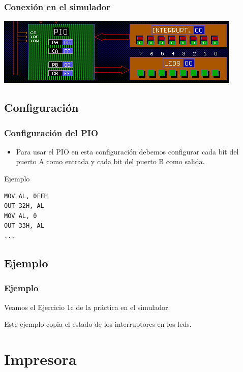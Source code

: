 \documentclass{beamer}
\begin{document}
\begin{frame}
\frametitle{Conexión en el simulador}
\begin{center}
 \includegraphics[scale=0.75]{pio0.png}
\end{center}
\end{frame}


\subsection{Configuración}
\begin{frame}[fragile]
\frametitle{Configuración del PIO}
\begin{itemize}
  \item Para usar el PIO en esta configuración debemos configurar cada bit del puerto A como entrada y cada bit del puerto B como salida.
\end{itemize}

\begin{block}{Ejemplo}
\begin{verbatim}
MOV AL, 0FFH
OUT 32H, AL
MOV AL, 0
OUT 33H, AL
...
\end{verbatim}

\end{block}

\end{frame}

\subsection{Ejemplo}
\begin{frame}
\frametitle{Ejemplo}
Veamos el Ejercicio 1c de la práctica en el simulador.

Este ejemplo copia el estado de los interruptores en los leds.
\end{frame}


\section{Impresora}
\end{document}
